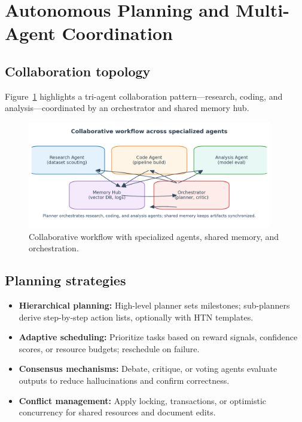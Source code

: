\documentclass{article}
\begin{document}
\section{Autonomous Planning and Multi-Agent Coordination}
\subsection{Collaboration topology}
Figure~\ref{fig:agent_collaboration_en} highlights a tri-agent collaboration pattern—research, coding, and analysis—coordinated by an orchestrator and shared memory hub.
\begin{figure}[H]
  \centering
  \includegraphics[width=0.95\textwidth]{agent_collaboration.png}
  \caption{Collaborative workflow with specialized agents, shared memory, and orchestration.}
  \label{fig:agent_collaboration_en}
\end{figure}

\subsection{Planning strategies}
\begin{itemize}
  \item \textbf{Hierarchical planning:} High-level planner sets milestones; sub-planners derive step-by-step action lists, optionally with HTN templates.
  \item \textbf{Adaptive scheduling:} Prioritize tasks based on reward signals, confidence scores, or resource budgets; reschedule on failure.
  \item \textbf{Consensus mechanisms:} Debate, critique, or voting agents evaluate outputs to reduce hallucinations and confirm correctness.
  \item \textbf{Conflict management:} Apply locking, transactions, or optimistic concurrency for shared resources and document edits.
\end{itemize}
\end{document}
